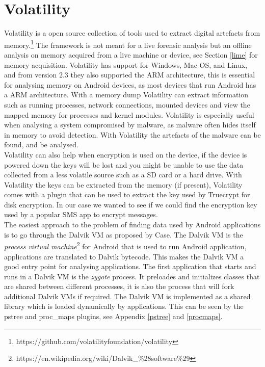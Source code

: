 \section{Volatility}
Volatility is a open source collection of tools used to extract digital
artefacts from memory.\footnote{https://github.com/volatilityfoundation/volatility} 
The framework is not meant for a live forensic analysis but an offline analysis
on memory acquired from a live machine or device, see Section \ref{lime} for
memory acquisition. Volatility has support for Windows, Mac OS, and Linux, and
from version 2.3 they also supported the ARM architecture, this is essential
for analysing memory on Android devices, as most devices that run Android has a
ARM architecture. With a memory dump Volatility can extract information such as
running processes, network connections, mounted devices and view the mapped
memory for processes and kernel modules. Volatility is especially useful when
analysing a system compromised by malware, as malware often hides itself in
memory to avoid detection. With Volatility the artefacts of the malware can be
found, and be analysed. \\

Volatility can also help when encryption is used on the device, if the device is
powered down the keys will be lost and you might be unable to use the data 
collected from a less volatile source such as a SD card or a hard drive. With
Volatility the keys can be extracted from the memory (if present), Volatility 
comes with a plugin that can be used to extract the key used by Truecrypt for 
disk encryption. In our case we wanted to see if we could find the encryption
key used by a popular SMS app to encrypt messages.\\

The easiest approach to the problem of finding data used by Android
applications is to go through the Dalvik VM as proposed by Case\cite{case2011}.
The Dalvik VM is the \textit{process virtual
machine}\footnote{https://en.wikipedia.org/wiki/Dalvik\_\%28software\%29} for
Android that is used to run Android application, applications are translated to
Dalvik bytecode. This makes the Dalvik VM a good entry point for analysing
applications. The first application that starts and runs in a Dalvik VM is the
\textit{zygote} process. It preloades and initializes classes that are shared
between different processes, it is also the process that will fork additional
Dalvik VMs if required. The Dalvik VM is implemented as a shared library which
is loaded dynamically by applications. This can be seen by the pstree and
proc\_maps plugins, see Appendix \ref{pstree} and \ref{procmaps}. \\

